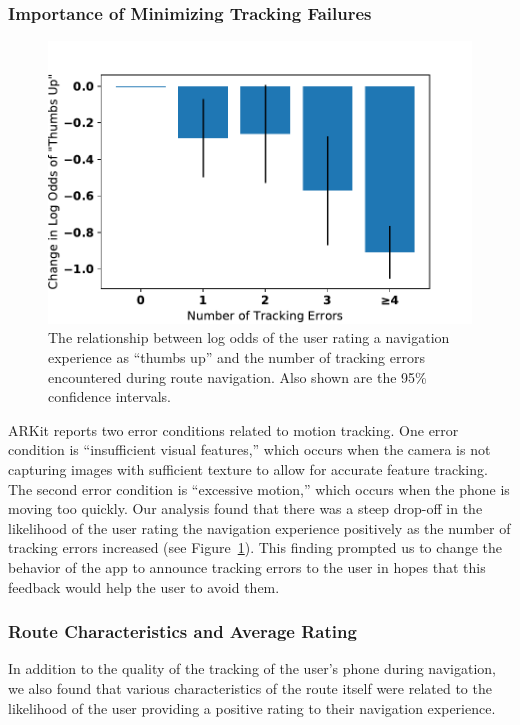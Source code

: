 \documentclass[chi]{sigchi}
\begin{document}
\subsubsection{Importance of Minimizing Tracking Failures}
\begin{figure}
\includegraphics[width=\linewidth]{figures/trackingerrors}
\caption{The relationship between log odds of the user rating a navigation experience as ``thumbs up'' and the number of tracking errors encountered during route navigation.  Also shown are the 95\% confidence intervals.\label{fig:trackingerrors}}
\end{figure}

ARKit reports two error conditions related to motion tracking.  One error condition is ``insufficient visual features,'' which occurs when the camera is not capturing images with sufficient texture to allow for accurate feature tracking.  The second error condition is ``excessive motion,'' which occurs when the phone is moving too quickly.  Our analysis found that there was a steep drop-off in the likelihood of the user rating the navigation experience positively as the number of tracking errors increased (see Figure~\ref{fig:trackingerrors}).  This finding prompted us to change the behavior of the app to announce tracking errors to the user in hopes that this feedback would help the user to avoid them.

\subsubsection{Route Characteristics and Average Rating}
In addition to the quality of the tracking of the user's phone during navigation, we also found that various characteristics of the route itself were related to the likelihood of the user providing a positive rating to their navigation experience.
\end{document}

